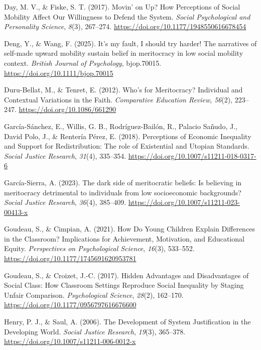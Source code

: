 \documentclass[
  13pt,
]{article}
\newlength{\cslhangindent}
\newenvironment{CSLReferences}[2] %
 {\begin{list}{}{%
  \setlength{\itemindent}{0pt}
  \setlength{\leftmargin}{0pt}
  \setlength{\parsep}{0pt}
  \ifodd #1
   \setlength{\leftmargin}{\cslhangindent}
   \setlength{\itemindent}{-1\cslhangindent}
  \fi
  \setlength{\itemsep}{#2\baselineskip}}}
 {\end{list}}
\begin{document}
\begin{CSLReferences}{1}{0}
Day, M. V., \& Fiske, S. T. (2017). Movin' on {Up}? {How Perceptions} of
{Social Mobility Affect Our Willingness} to {Defend} the {System}.
\emph{Social Psychological and Personality Science}, \emph{8}(3),
267--274. \url{https://doi.org/10.1177/1948550616678454}

Deng, Y., \& Wang, F. (2025). It's my fault, {I} should try harder!
{The} narratives of self-made upward mobility sustain belief in
meritocracy in low social mobility context. \emph{British Journal of
Psychology}, bjop.70015. \url{https://doi.org/10.1111/bjop.70015}

Duru-Bellat, M., \& Tenret, E. (2012). Who's for {Meritocracy}?
{Individual} and {Contextual Variations} in the {Faith}.
\emph{Comparative Education Review}, \emph{56}(2), 223--247.
\url{https://doi.org/10.1086/661290}

García-Sánchez, E., Willis, G. B., Rodríguez-Bailón, R., Palacio Sañudo,
J., David Polo, J., \& Rentería Pérez, E. (2018). Perceptions of
{Economic Inequality} and {Support} for {Redistribution}: {The} role of
{Existential} and {Utopian Standards}. \emph{Social Justice Research},
\emph{31}(4), 335--354. \url{https://doi.org/10.1007/s11211-018-0317-6}

García-Sierra, A. (2023). The dark side of meritocratic beliefs: {Is}
believing in meritocracy detrimental to individuals from low
socioeconomic backgrounds? \emph{Social Justice Research}, \emph{36}(4),
385--409. \url{https://doi.org/10.1007/s11211-023-00413-x}

Goudeau, S., \& Cimpian, A. (2021). How {Do Young Children Explain
Differences} in the {Classroom}? {Implications} for {Achievement},
{Motivation}, and {Educational Equity}. \emph{Perspectives on
Psychological Science}, \emph{16}(3), 533--552.
\url{https://doi.org/10.1177/1745691620953781}

Goudeau, S., \& Croizet, J.-C. (2017). Hidden {Advantages} and
{Disadvantages} of {Social Class}: {How Classroom Settings Reproduce
Social Inequality} by {Staging Unfair Comparison}. \emph{Psychological
Science}, \emph{28}(2), 162--170.
\url{https://doi.org/10.1177/0956797616676600}

Henry, P. J., \& Saul, A. (2006). The {Development} of {System
Justification} in the {Developing World}. \emph{Social Justice
Research}, \emph{19}(3), 365--378.
\url{https://doi.org/10.1007/s11211-006-0012-x}


\end{CSLReferences}
\end{document}
